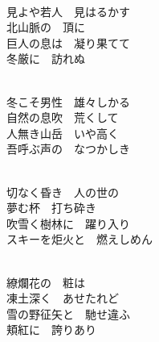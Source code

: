 \documentclass[10pt,b5j]{tarticle} %
\begin{document}
\vspace{1.5em} %
\newcommand{\linespace}{0.5em} %
\newcommand{\blocksize}{0.5\hsize} %
\newcommand{\itemmargin}{3em} %
\begin{enumerate} %
    \setlength{\itemindent}{\itemmargin} %
    \begin{minipage}[c]{\blocksize}
    
        \vspace{\linespace}
        \item~\\
        見よや若人　見はるかす\\
        北山脈の　頂に\\
        巨人の息は　凝り果てて\\
        冬厳に　訪れぬ
        
    \end{minipage}
    \begin{minipage}[c]{\blocksize}
        
        \vspace{\linespace}
        \item~\\
        冬こそ男性　雄々しかる\\
        自然の息吹　荒くして\\
        人無き山岳　いや高く\\
        吾呼ぶ声の　なつかしき
        
    \end{minipage}
    \begin{minipage}[c]{\blocksize}
        
        \vspace{\linespace}
        \item~\\
        切なく昏き　人の世の\\
        夢む杯　打ち砕き\\
        吹雪く樹林に　躍り入り\\
        スキーを炬火と　燃えしめん
        
    \end{minipage}
    \begin{minipage}[c]{\blocksize}
        
        \vspace{\linespace}
        \item~\\
        繚爛花の　粧は\\
        凍土深く　あせたれど\\
        雪の野征矢と　馳せ違ふ\\
        頬紅に　誇りあり
        

\end{minipage}
\end{enumerate}
\end{document}
